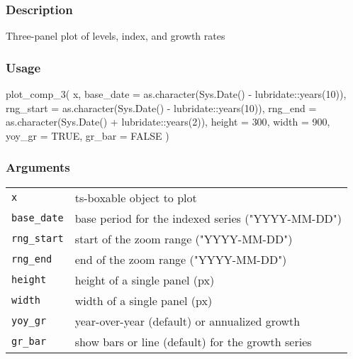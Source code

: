 \documentclass[
  letterpaper,
  DIV=11,
  numbers=noendperiod]{scrreport}
\newenvironment{Shaded}{\begin{snugshade}}{\end{snugshade}}
\newcommand{\AttributeTok}[1]{\textcolor[rgb]{0.40,0.45,0.13}{#1}}
\newcommand{\ConstantTok}[1]{\textcolor[rgb]{0.56,0.35,0.01}{#1}}
\newcommand{\DecValTok}[1]{\textcolor[rgb]{0.68,0.00,0.00}{#1}}
\newcommand{\FunctionTok}[1]{\textcolor[rgb]{0.28,0.35,0.67}{#1}}
\newcommand{\NormalTok}[1]{\textcolor[rgb]{0.00,0.23,0.31}{#1}}
\newcommand{\SpecialCharTok}[1]{\textcolor[rgb]{0.37,0.37,0.37}{#1}}
\begin{document}
\subsubsection{Description}\label{description-66}

Three-panel plot of levels, index, and growth rates

\subsubsection{Usage}\label{usage-66}

\begin{Shaded}
\begin{Highlighting}[]
\FunctionTok{plot\_comp\_3}\NormalTok{(}
\NormalTok{  x,}
  \AttributeTok{base\_date =} \FunctionTok{as.character}\NormalTok{(}\FunctionTok{Sys.Date}\NormalTok{() }\SpecialCharTok{{-}}\NormalTok{ lubridate}\SpecialCharTok{::}\FunctionTok{years}\NormalTok{(}\DecValTok{10}\NormalTok{)),}
  \AttributeTok{rng\_start =} \FunctionTok{as.character}\NormalTok{(}\FunctionTok{Sys.Date}\NormalTok{() }\SpecialCharTok{{-}}\NormalTok{ lubridate}\SpecialCharTok{::}\FunctionTok{years}\NormalTok{(}\DecValTok{10}\NormalTok{)),}
  \AttributeTok{rng\_end =} \FunctionTok{as.character}\NormalTok{(}\FunctionTok{Sys.Date}\NormalTok{() }\SpecialCharTok{+}\NormalTok{ lubridate}\SpecialCharTok{::}\FunctionTok{years}\NormalTok{(}\DecValTok{2}\NormalTok{)),}
  \AttributeTok{height =} \DecValTok{300}\NormalTok{,}
  \AttributeTok{width =} \DecValTok{900}\NormalTok{,}
  \AttributeTok{yoy\_gr =} \ConstantTok{TRUE}\NormalTok{,}
  \AttributeTok{gr\_bar =} \ConstantTok{FALSE}
\NormalTok{)}
\end{Highlighting}
\end{Shaded}

\subsubsection{Arguments}\label{arguments-66}

\begin{longtable}[]{@{}ll@{}}
\toprule\noalign{}
\endhead
\bottomrule\noalign{}
\endlastfoot
\texttt{x} & ts-boxable object to plot \\
\texttt{base\_date} & base period for the indexed series
("YYYY-MM-DD") \\
\texttt{rng\_start} & start of the zoom range ("YYYY-MM-DD") \\
\texttt{rng\_end} & end of the zoom range ("YYYY-MM-DD") \\
\texttt{height} & height of a single panel (px) \\
\texttt{width} & width of a single panel (px) \\
\texttt{yoy\_gr} & year-over-year (default) or annualized growth \\
\texttt{gr\_bar} & show bars or line (default) for the growth series \\
\end{longtable}
\end{document}
